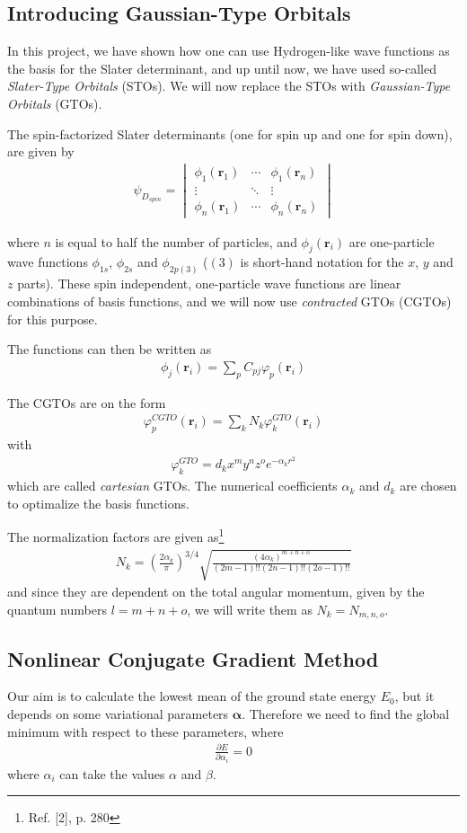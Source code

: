 \documentclass[twocolumns, a4paper,10pt,fleqn]{extarticle}
\newcommand{\eq}[1]{{\small\begin{align*}#1\end{align*}}}
\newcommand{\equ}[1]{{\small\begin{align}#1\end{align}}}
\newcommand{\vmat}[1]{\begin{vmatrix}#1\end{vmatrix}}
\renewcommand\vec[1]{\boldsymbol{\mathbf{#1}}}
\begin{document}
\subsection{Introducing Gaussian-Type Orbitals}
In this project, we have shown how one can use Hydrogen-like wave functions as the basis
for the Slater determinant, and up until now, 
we have used so-called \textit{Slater-Type Orbitals} (STOs).
We will now replace the STOs with \textit{Gaussian-Type Orbitals} (GTOs).

The spin-factorized Slater determinants (one for spin up and one for spin down),
are given by
\eq{\psi_{D_{spin}} = 
  \vmat{\phi_1(\vec r_1)& \cdots & \phi_1(\vec r_n)\\
  \vdots&\ddots&\vdots\\
  \phi_n(\vec r_1)& \cdots & \phi_n(\vec r_n)}
}

where $n$ is equal to half the number of particles, 
and  $\phi_j(\vec r_i)$ are one-particle wave functions 
$\phi_{1s}$, $\phi_{2s}$ and $\phi_{2p(3)}$
($(3)$ is short-hand notation for the $x$, $y$ and $z$ parts).
These spin independent, one-particle wave functions are
linear combinations of basis functions, and we will now use \textit{contracted} GTOs
(CGTOs) for this purpose.

The functions can then be written as
\equ{\phi_j(\vec r_i) = \sum_p C_{pj} \varphi_p(\vec r_i)\label{eq:gto}
}

The CGTOs are on the form
\eq{
  \varphi_p^{CGTO}(\vec r_i) = \sum_k N_k \varphi^{GTO}_k(\vec r_i)
}
with
\eq{
  \varphi^{GTO}_k = d_k x^m y^n z^o e^{-\alpha_k r^2}
}
which are called \textit{cartesian} GTOs. 
The numerical coefficients $\alpha_k$ and $d_k$ are chosen to optimalize the
basis functions.

The normalization factors are given as\footnote{Ref. [2], p. 280}
\eq{
  N_k = \left(\frac{2\alpha_k}{\pi}\right)^{3/4}
  \sqrt{\frac{(4\alpha_k)^{m+n+o}}{(2m-1)!!(2n-1)!!(2o-1)!!}}
}
and since they are dependent on the total angular momentum,
given by the quantum numbers $l = m+n+o$, we will write them as
$N_k = N_{m,n,o}$.

\subsection{Nonlinear Conjugate Gradient Method}
Our aim is to calculate the lowest mean of the ground state energy $E_0$,
but it depends on some variational parameters $\vec \alpha$.
Therefore we need to find the global minimum with respect to these parameters,
where
\eq{
  \frac{\partial E}{\partial \alpha_i} = 0
}
where $\alpha_i$ can take the values $\alpha$ and $\beta$.
\end{document}
